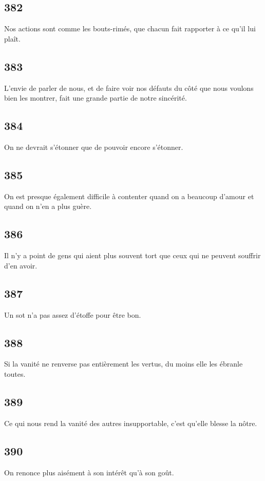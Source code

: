 \documentclass[french,twoside]{book} %
\begin{document}
\subsection[{382}]{ \textsc{382} }
\noindent Nos actions sont comme les bouts-rimés, que chacun fait rapporter à ce qu’il lui plaît.
\subsection[{383}]{ \textsc{383} }
\noindent L’envie de parler de nous, et de faire voir nos défauts du côté que nous voulons bien les montrer, fait une grande partie de notre sincérité.
\subsection[{384}]{ \textsc{384} }
\noindent On ne devrait s’étonner que de pouvoir encore s’étonner.
\subsection[{385}]{ \textsc{385} }
\noindent On est presque également difficile à contenter quand on a beaucoup d’amour et quand on n’en a plus guère.
\subsection[{386}]{ \textsc{386} }
\noindent Il n’y a point de gens qui aient plus souvent tort que ceux qui ne peuvent souffrir d’en avoir.
\subsection[{387}]{ \textsc{387} }
\noindent Un sot n’a pas assez d’étoffe pour être bon.
\subsection[{388}]{ \textsc{388} }
\noindent Si la vanité ne renverse pas entièrement les vertus, du moins elle les ébranle toutes.
\subsection[{389}]{ \textsc{389} }
\noindent Ce qui nous rend la vanité des autres insupportable, c’est qu’elle blesse la nôtre.
\subsection[{390}]{ \textsc{390} }
\noindent On renonce plus aisément à son intérêt qu’à son goût.
\end{document}
